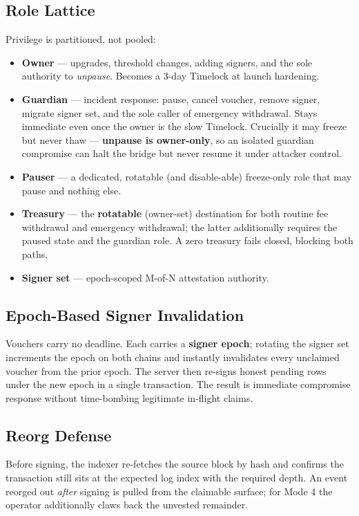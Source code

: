 \documentclass[11pt,a4paper]{article}
\begin{document}
\subsection{Role Lattice}

Privilege is partitioned, not pooled:

\begin{itemize}
  \item \textbf{Owner} --- upgrades, threshold changes, adding signers, and the sole authority to \emph{unpause}. Becomes a 3-day Timelock at launch hardening.
  \item \textbf{Guardian} --- incident response: pause, cancel voucher, remove signer, migrate signer set, and the sole caller of emergency withdrawal. Stays immediate even once the owner is the slow Timelock. Crucially it may freeze but never thaw --- \textbf{unpause is owner-only}, so an isolated guardian compromise can halt the bridge but never resume it under attacker control.
  \item \textbf{Pauser} --- a dedicated, rotatable (and disable-able) freeze-only role that may pause and nothing else.
  \item \textbf{Treasury} --- the \textbf{rotatable} (owner-set) destination for both routine fee withdrawal and emergency withdrawal; the latter additionally requires the paused state and the guardian role. A zero treasury fails closed, blocking both paths.
  \item \textbf{Signer set} --- epoch-scoped M-of-N attestation authority.
\end{itemize}

\subsection{Epoch-Based Signer Invalidation}

Vouchers carry no deadline. Each carries a \textbf{signer epoch}; rotating the signer set increments the epoch on both chains and instantly invalidates every unclaimed voucher from the prior epoch. The server then re-signs honest pending rows under the new epoch in a single transaction. The result is immediate compromise response without time-bombing legitimate in-flight claims.

\subsection{Reorg Defense}

Before signing, the indexer re-fetches the source block by hash and confirms the transaction still sits at the expected log index with the required depth. An event reorged out \emph{after} signing is pulled from the claimable surface; for Mode 4 the operator additionally claws back the unvested remainder.
\end{document}
